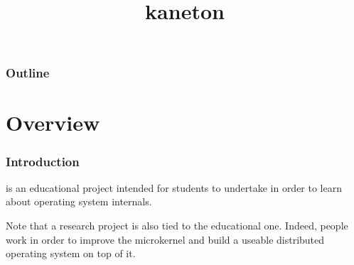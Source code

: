 %
%
%
%
%
%

%
%

%
%

\def\path{../../..}

%
%



%
%

\title{kaneton}

%
%



%
%

\begin{frame}
  \titlepage
\end{frame}

%
%

\begin{frame}
  \frametitle{Outline}

  \tableofcontents
\end{frame}

%
%


%
%

\section{Overview}


\begin{frame}
  \frametitle{Introduction}

   is an educational project intended for students to undertake
  in order to learn about operating system internals.

  \-

  Note that a research project is also tied to the educational one. Indeed,
  people work in order to improve the microkernel and build a useable
  distributed operating system on top of it.
\end{frame}


